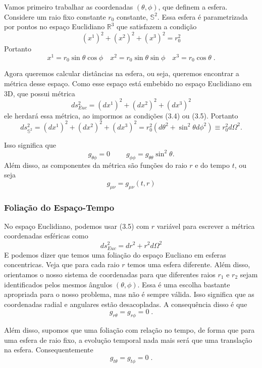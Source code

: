 \documentclass[11pt]{article}
\begin{document}
    Vamos primeiro trabalhar as coordenadas \((\theta, \phi)\), que definem
a esfera. Considere um raio fixo constante \(r_0\) constante,
\(\mathbb{S}^2\). Essa esfera é parametrizada por pontos no espaço
Euclidiano \(\mathbb{R}^3\) que satisfazem a condição
\[\tag{3.5} (x^1)^2 + (x^2)^2 + (x^3)^2 = r_0^2 \] Portanto
\[ \tag{3.6} x^1 = r_0 \sin\theta \cos\phi\quad x^2 = r_0 \sin\theta \sin\phi\quad  x^3 = r_0 \cos\theta\; .\]

Agora queremos calcular distâncias na esfera, ou seja, queremos
encontrar a métrica desse espaço. Como esse espaço está embebido no
espaço Euclidiano em 3D, que possui métrica
\[ ds^2_{Euc} = (dx^1)^2 + (dx^2)^2 + (dx^3)^2 \] ele herdará essa
métrica, ao impormos as condições (3.4) ou (3.5). Portanto
\[ \tag{3.7} ds^2_{\mathbb{S}^2} = (dx^1)^2 + (dx^2)^2 + (dx^3)^2 = r_0^2 (d\theta^2 + \sin^2\theta d\phi^2) \equiv r_0^2  d\Omega^2.\]

Isso significa que \[ \tag{3.8}  \boxed{g_{\theta \phi} = 0}\; \qquad 
\boxed{g_{\phi\phi}   = g_{\theta\theta} \sin^2\theta }. \] Além disso,
as componentes da métrica são funções do raio \(r\) e do tempo \(t\), ou
seja \[ \tag{3.9}  \boxed{g_{\mu\nu} = g_{\mu\nu}(t,r)}\]

    \hypertarget{foliauxe7uxe3o-do-espauxe7o-tempo}{%
\subsubsection{Foliação do
Espaço-Tempo}\label{foliauxe7uxe3o-do-espauxe7o-tempo}}

    No espaço Euclidiano, podemos usar (3.5) com \(r\) variável para
escrever a métrica coordenadas esféricas como
\[\tag{3.10} ds_{Euc}^2 = dr^2 + r^2 d\Omega^2\] E podemos dizer que
temos uma foliação do espaço Eucliano em esferas concentricas. Veja que
para cada raio \(r\) temos uma esfera diferente. Além disso, orientamos
o nosso sistema de coordenadas para que diferentes raios \(r_1\) e
\(r_2\) sejam identificados pelos mesmos ângulos \((\theta, \phi)\).
Essa é uma escolha bastante apropriada para o nosso problema, mas não é
sempre válida. Isso significa que as coordenadas radial e angulares
estão desacopladas. A consequência disso é que
\[ \tag{3.11} \boxed{g_{r \theta} = g_{r \phi} = 0}\; . \]

Além disso, supomos que uma foliação com relação no tempo, de forma que
para uma esfera de raio fixo, a evolução temporal nada mais será que uma
translação na esfera. Consequentemente
\[ \tag{3.12} \boxed{g_{t \theta} = g_{t \phi} = 0}\; . \]
\end{document}
